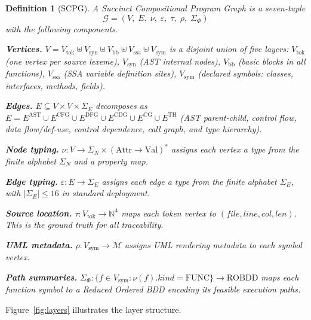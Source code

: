 \documentclass[journal,10pt,twoside]{IEEEtran}
\newtheorem{definition}[theorem]{Definition}
\newcommand{\SCPG}{\mathcal{G}}
\newcommand{\VT}{V_{\!\mathrm{tok}}}
\newcommand{\VS}{V_{\!\mathrm{syn}}}
\newcommand{\VB}{V_{\!\mathrm{bb}}}
\newcommand{\VSSA}{V_{\!\mathrm{ssa}}}
\newcommand{\VSYM}{V_{\!\mathrm{sym}}}
\newcommand{\EAST}{E^{\mathrm{AST}}}
\newcommand{\ECFG}{E^{\mathrm{CFG}}}
\newcommand{\EDFG}{E^{\mathrm{DFG}}}
\newcommand{\ECDG}{E^{\mathrm{CDG}}}
\newcommand{\ECG}{E^{\mathrm{CG}}}
\newcommand{\ETH}{E^{\mathrm{TH}}}
\newcommand{\SigN}{\Sigma_{\!N}}
\newcommand{\SigE}{\Sigma_{\!E}}
\newcommand{\SigPhi}{\Sigma_{\!\Phi}}
\newcommand{\tauF}{\tau}
\newcommand{\ROBDD}{\mathrm{ROBDD}}
\begin{document}
\begin{definition}[SCPG]\label{def:scpg}
A \emph{Succinct Compositional Program Graph} is a seven-tuple
\[
  \SCPG = (V,\; E,\; \nu,\; \varepsilon,\; \tauF,\;
           \rho,\; \SigPhi)
\]
with the following components.

\smallskip\noindent\textbf{Vertices.}
$V = \VT \uplus \VS \uplus \VB \uplus \VSSA \uplus \VSYM$
is a disjoint union of five layers:
$\VT$ (one vertex per source lexeme),
$\VS$ (AST internal nodes),
$\VB$ (basic blocks in all functions),
$\VSSA$ (SSA variable definition sites),
$\VSYM$ (declared symbols: classes, interfaces, methods,
fields).

\smallskip\noindent\textbf{Edges.}
$E \subseteq V \times V \times \SigE$ decomposes as
$E = \EAST \cup \ECFG \cup \EDFG \cup \ECDG \cup
     \ECG \cup \ETH$
(AST parent-child, control flow, data flow/def-use, control
dependence, call graph, and type hierarchy).

\smallskip\noindent\textbf{Node typing.}
$\nu : V \to \SigN \times (\mathrm{Attr} \to \mathrm{Val})^*$
assigns each vertex a type from the finite alphabet $\SigN$
and a property map.

\smallskip\noindent\textbf{Edge typing.}
$\varepsilon : E \to \SigE$ assigns each edge a type from
the finite alphabet $\SigE$, with $|\SigE| \le 16$ in
standard deployment.

\smallskip\noindent\textbf{Source location.}
$\tauF : \VT \to \mathbb{N}^4$ maps each token vertex to
$(\mathit{file}, \mathit{line}, \mathit{col}, \mathit{len})$.
This is the ground truth for all traceability.

\smallskip\noindent\textbf{UML metadata.}
$\rho : \VSYM \to \mathcal{M}$ assigns UML rendering
metadata to each symbol vertex.

\smallskip\noindent\textbf{Path summaries.}
$\SigPhi : \{f \in \VSYM : \nu(f).\mathit{kind} =
\mathrm{FUNC}\} \to \ROBDD$ maps each function symbol to a
Reduced Ordered BDD encoding its feasible execution paths.
\end{definition}

Figure~\ref{fig:layers} illustrates the layer structure.
\end{document}
